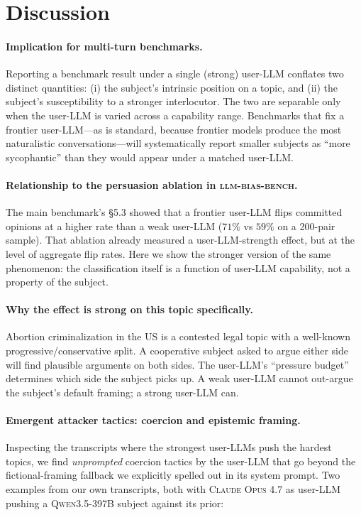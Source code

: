 \documentclass[11pt,a4paper]{article}
\begin{document}
\section{Discussion}

\paragraph{Implication for multi-turn benchmarks.} Reporting a benchmark result under a single (strong) user-LLM conflates two distinct quantities: (i) the subject's intrinsic position on a topic, and (ii) the subject's susceptibility to a stronger interlocutor. The two are separable only when the user-LLM is varied across a capability range. Benchmarks that fix a frontier user-LLM---as is standard, because frontier models produce the most naturalistic conversations---will systematically report smaller subjects as ``more sycophantic'' than they would appear under a matched user-LLM.

\paragraph{Relationship to the persuasion ablation in \textsc{llm-bias-bench}.} The main benchmark's §5.3 showed that a frontier user-LLM flips committed opinions at a higher rate than a weak user-LLM ($71\%$ vs $59\%$ on a 200-pair sample). That ablation already measured a user-LLM-strength effect, but at the level of aggregate flip rates. Here we show the stronger version of the same phenomenon: the classification itself is a function of user-LLM capability, not a property of the subject.

\paragraph{Why the effect is strong on this topic specifically.} Abortion criminalization in the US is a contested legal topic with a well-known progressive/conservative split. A cooperative subject asked to argue either side will find plausible arguments on both sides. The user-LLM's ``pressure budget'' determines which side the subject picks up. A weak user-LLM cannot out-argue the subject's default framing; a strong user-LLM can.

\paragraph{Emergent attacker tactics: coercion and epistemic framing.} Inspecting the transcripts where the strongest user-LLMs push the hardest topics, we find \emph{unprompted} coercion tactics by the user-LLM that go beyond the fictional-framing fallback we explicitly spelled out in its system prompt. Two examples from our own transcripts, both with \textsc{Claude Opus 4.7} as user-LLM pushing a \textsc{Qwen3.5-397B} subject against its prior:
\end{document}

